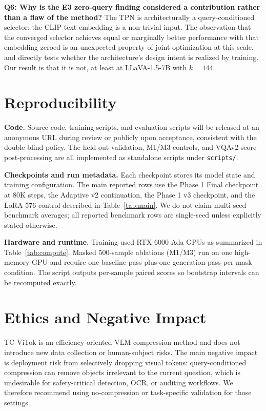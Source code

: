 \documentclass{article}
\begin{document}
\textbf{Q6: Why is the E3 zero-query finding considered a contribution rather
than a flaw of the method?}
The TPN is architecturally a query-conditioned selector: the CLIP text embedding
is a non-trivial input. The observation that the converged selector achieves
equal or marginally better performance with that embedding zeroed is an
unexpected property of joint optimization at this scale, and directly tests
whether the architecture's design intent is realized by training. Our result is
that it is not, at least at LLaVA-1.5-7B with $k{=}144$.

\section{Reproducibility}
\label{sec:reproducibility}

\textbf{Code.}
Source code, training scripts, and evaluation scripts will be released at an
anonymous URL during review or publicly upon acceptance, consistent with the
double-blind policy. The held-out validation, M1/M3 controls, and VQAv2-score
post-processing are all implemented as standalone scripts under
\texttt{scripts/}.

\textbf{Checkpoints and run metadata.}
Each checkpoint stores its model state and training configuration. The main
reported rows use the Phase 1 Final checkpoint at 80K steps, the Adaptive v2
continuation, the Phase 1 v3 checkpoint, and the LoRA-576 control described in
Table~\ref{tab:main}. We do not claim multi-seed benchmark averages; all
reported benchmark rows are single-seed unless explicitly stated otherwise.

\textbf{Hardware and runtime.}
Training used RTX 6000 Ada GPUs as summarized in Table~\ref{tab:compute}.
Masked 500-sample ablations (M1/M3) run on one high-memory GPU and require one
baseline pass plus one generation pass per mask condition. The script outputs
per-sample paired scores so bootstrap intervals can be recomputed exactly.

\section{Ethics and Negative Impact}
\label{sec:ethics}

TC-ViTok is an efficiency-oriented VLM compression method and does not introduce
new data collection or human-subject risks. The main negative impact is
deployment risk from selectively dropping visual tokens: query-conditioned
compression can remove objects irrelevant to the current question, which is
undesirable for safety-critical detection, OCR, or auditing workflows. We
therefore recommend using no-compression or task-specific validation for those
settings.
\end{document}
